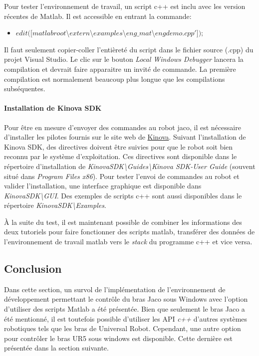 \documentclass[root.tex]{subfiles}
\begin{document}
Pour tester l'environnement de travail, un script c++ est inclu avec les version récentes de Matlab. 
Il est accessible en entrant la commande:
\begin{itemize}
\item $ edit([ matlabroot $\textbackslash$ extern$\textbackslash$ examples$\textbackslash$ eng\_mat$\textbackslash$ engdemo.cpp' ]);$
\end{itemize}

Il faut seulement copier-coller l'entièreté du script dans le fichier source (.cpp) du projet Visual Studio. Le clic sur le bouton \textit{Local Windows Debugger} lancera la compilation et devrait faire apparaitre un invité de commande. 
La première compilation est normalement beaucoup plus longue que les compilations subséquentes.

\paragraph{Installation de Kinova SDK}
Pour être en mesure d'envoyer des commandes au robot jaco, il est nécessaire d'installer les pilotes fournis sur le site web de \href{https://drive.google.com/open?id=0B790iVm0vRTlRFNFRldIb2Jmbkk}{Kinova}.
Suivant l'installation de Kinova SDK, des directives doivent être suivies pour que le robot soit bien reconnu par le système d'exploitation.
Ces directives sont disponible dans le répertoire d'installation de \textit{KinovaSDK\textbackslash Guides\textbackslash Kinova SDK-User Guide} (souvent situé dans \textit{Program Files x86}).
Pour tester l'envoi de commandes au robot et valider l'installation, une interface graphique est disponible dans \textit{KinovaSDK\textbackslash GUI}.
Des exemples de scripts c++ sont aussi disponibles dans le répertoire \textit{KinovaSDK\textbackslash Examples}.


À la suite du test, il est maintenant possible de combiner les informations des deux tutoriels pour faire fonctionner des scripts matlab, transférer des données de l'environnement de travail matlab vers le \textit{stack} du programme c++ et vice versa.

\subsection{Conclusion}

Dans cette section, un survol de l'implémentation de l'environnement de développement permettant le contrôle du bras Jaco sous Windows avec l'option d'utiliser des scripts Matlab a été présentée.
Bien que seulement le bras Jaco a été mentionné, il est toutefois possible d'utiliser les API \textit{c++} d'autres systèmes robotiques tels que les bras de Universal Robot. 
Cependant, une autre option pour contrôler le bras UR5 sous windows est disponible.
Cette dernière est présentée dans la section suivante.
\newpage
\end{document}
